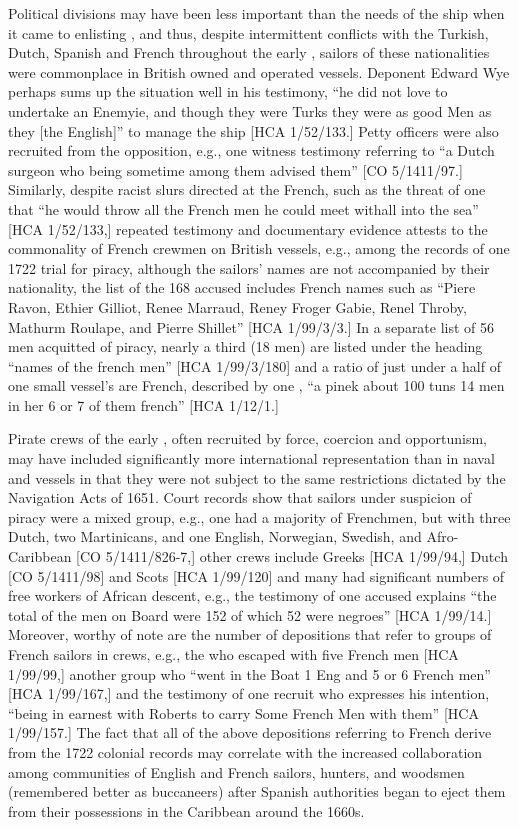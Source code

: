 Political divisions may have been less important than the needs of the ship when it came to enlisting , and thus, despite intermittent conflicts with the Turkish, Dutch, Spanish and French throughout the early , sailors of these nationalities were commonplace in British owned and operated vessels. Deponent Edward Wye perhaps sums up the situation well in his testimony, “he did not love to undertake an Enemyie, and though they were Turks they were as good Men as they [the English]” to manage the ship [HCA 1/52/133.] Petty officers were also recruited from the opposition, e.g., one witness testimony referring to “a Dutch surgeon who being sometime among them advised them” [CO 5/1411/97.] Similarly, despite racist slurs directed at the French, such as the threat of one  that “he would throw all the French men he could meet withall into the sea” [HCA 1/52/133,] repeated testimony and documentary evidence attests to the commonality of French crewmen on British vessels, e.g., among the records of one 1722 trial for piracy, although the sailors’ names are not accompanied by their nationality, the list of the 168 accused includes French names such as “Piere Ravon, Ethier Gilliot, Renee Marraud, Reney Froger Gabie, Renel Throby, Mathurm Roulape, and Pierre Shillet” [HCA 1/99/3/3.] In a separate list of 56 men acquitted of piracy, nearly a third (18 men) are listed under the heading “names of the french men” [HCA 1/99/3/180] and a ratio of just under a half of one small vessel’s  are French, described by one , “a pinek about 100 tuns 14 men in her 6 or 7 of them french” [HCA 1/12/1.] 

Pirate crews of the early , often recruited by force, coercion and opportunism, may have included significantly more international representation than in naval and  vessels in that they were not subject to the same restrictions dictated by the Navigation Acts of 1651. Court records show that sailors under suspicion of piracy were a mixed group, e.g., one  had a majority of Frenchmen, but with three Dutch, two Martinicans, and one English, Norwegian, Swedish, and Afro-Caribbean  [CO 5/1411/826-7,] other crews include Greeks [HCA 1/99/94,] Dutch  [CO 5/1411/98] and Scots [HCA 1/99/120] and many had significant numbers of free workers of African descent, e.g., the testimony of one accused  explains “the total of the men on Board were 152 of which 52 were negroes” [HCA 1/99/14.] Moreover, worthy of note are the number of depositions that refer to groups of French sailors in  crews, e.g., the  who escaped with five French men [HCA 1/99/99,] another group who “went in the Boat 1 Eng and 5 or 6 French men” [HCA 1/99/167,] and the testimony of one recruit who expresses his intention, “being in earnest with Roberts to carry Some French Men with them” [HCA 1/99/157.] The fact that all of the above depositions referring to French  derive from the 1722 colonial records may correlate with the increased collaboration among communities of English and French sailors, hunters, and woodsmen (remembered better as buccaneers) after Spanish authorities began to eject them from their possessions in the Caribbean around the 1660s.

